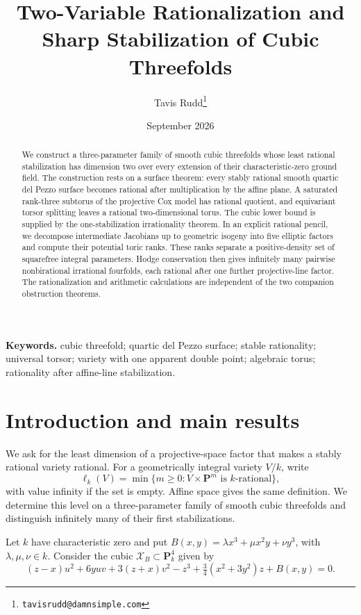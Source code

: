 \documentclass[11pt]{article}
\title{Two-Variable Rationalization and Sharp Stabilization of Cubic Threefolds}
\author{Tavis Rudd\thanks{\texttt{tavisrudd@damnsimple.com}}}
\date{September 2026}
\theoremstyle{remark}
\newcommand{\PP}{\mathbf P}
\begin{document}
\maketitle

\begin{abstract}
We construct a three-parameter family of smooth cubic threefolds whose
least rational stabilization has dimension two over every extension of
their characteristic-zero ground field. The construction rests on a
surface theorem: every stably rational smooth quartic del Pezzo surface
becomes rational after multiplication by the affine plane. A saturated
rank-three subtorus of the projective Cox model has rational quotient,
and equivariant torsor splitting leaves a rational two-dimensional torus.
The cubic lower bound is supplied by the one-stabilization irrationality
theorem. In an explicit rational pencil, we decompose intermediate
Jacobians up to geometric isogeny into five elliptic factors and compute
their potential toric ranks. These ranks separate a positive-density set
of squarefree integral parameters. Hodge conservation then gives infinitely
many pairwise nonbirational irrational fourfolds, each rational after one
further projective-line factor. The rationalization and arithmetic
calculations are independent of the two companion obstruction theorems.
\end{abstract}

\noindent\textbf{Keywords.} cubic threefold; quartic del Pezzo surface;
stable rationality; universal torsor; variety with one apparent double
point; algebraic torus; rationality after affine-line stabilization.

\section{Introduction and main results}

We ask for the least dimension of a projective-space factor that makes a
stably rational variety rational. For a geometrically integral variety \(V/k\), write
\[
 \ell_k(V)=\min\{m\geq0:V\times\PP^m\text{ is }k\text{-rational}\},
\]
with value infinity if the set is empty. Affine space gives the same
definition. We determine this level on a three-parameter family of smooth
cubic threefolds and distinguish infinitely many of their first stabilizations.

Let \(k\) have characteristic zero and put
\(B(x,y)=\lambda x^3+\mu x^2y+\nu y^3\), with \(\lambda,\mu,\nu\in k\).
Consider the cubic \(\mathcal X_B\subset\PP^4_k\) given by
\begin{equation}
 (z-x)u^2+6yuv+3(z+x)v^2-z^3
 +\tfrac34(x^2+3y^2)z+B(x,y)=0.
 \label{eq:uniform-cubic-family}
\end{equation}
\end{document}
